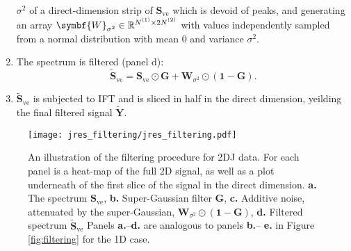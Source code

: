 \begin{enumerate}
        $\sigma^2$ of a direct-dimension strip of $\symbf{S}_{\text{ve}}$ which
        is devoid of peaks, and generating an array $\symbf{W}_{\sigma^2} \in
        \mathbb{R}^{\None \times 2 \Ntwo}$ with values independently sampled
        from a normal distribution with mean $0$ and variance  $\sigma^2$.
    \item The spectrum is filtered (panel d):
        \begin{equation}
            \widetilde{\symbf{S}}_{\text{ve}} = \symbf{S}_{\text{ve}} \odot
            \symbf{G} + \symbf{W}_{\sigma^2} \odot (\symbf{1} - \symbf{G}).
        \end{equation}
    \item $\widetilde{\symbf{S}}_{\text{ve}}$ is subjected to \ac{IFT} and is
        sliced in half in the direct dimension, yeilding the final filtered
        signal $\widetilde{\symbf{Y}}$.
\end{enumerate}

\begin{figure}
    \centering
    \texttt{[image: jres\_filtering/jres\_filtering.pdf]}
    \caption[
        An illustration of the filtering procedure for \ac{2DJ} data.
    ]
    {
        An illustration of the filtering procedure for \ac{2DJ} data.
        For each panel is a heat-map of the full \ac{2D} signal, as well as a
        plot underneath of the first slice of the signal in the direct
        dimension.
        \textbf{a.} The spectrum $\symbf{S}_{\text{ve}}$,
        \textbf{b.} Super-Gaussian filter $\symbf{G}$,
        \textbf{c.} Additive noise, attenuated by the super-Gaussian, $\symbf{W}_{\sigma^2} \odot (\symbf{1} - \symbf{G})$,
        \textbf{d.} Filtered spectrum $\widetilde{\symbf{S}}_{\text{ve}}$
        Panels \textbf{a.}--\textbf{d.} are analogous to panels \textbf{b.}--
        \textbf{e.} in Figure \ref{fig:filtering} for the \ac{1D} case.
    }
    \label{fig:jres-filtering}
\end{figure}


